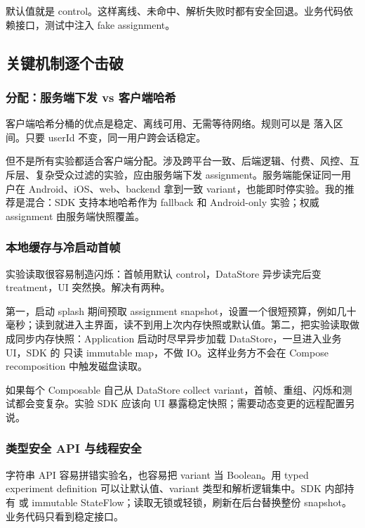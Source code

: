 默认值就是 control。这样离线、未命中、解析失败时都有安全回退。业务代码依赖接口，测试中注入 fake assignment。

\subsection{关键机制逐个击破}

\subsubsection{分配：服务端下发 vs 客户端哈希}

客户端哈希分桶的优点是稳定、离线可用、无需等待网络。规则可以是  落入区间。只要 userId 不变，同一用户跨会话稳定。

但不是所有实验都适合客户端分配。涉及跨平台一致、后端逻辑、付费、风控、互斥层、复杂受众过滤的实验，应由服务端下发 assignment。服务端能保证同一用户在 Android、iOS、web、backend 拿到一致 variant，也能即时停实验。我的推荐是混合：SDK 支持本地哈希作为 fallback 和 Android-only 实验；权威 assignment 由服务端快照覆盖。

\subsubsection{本地缓存与冷启动首帧}

实验读取很容易制造闪烁：首帧用默认 control，DataStore 异步读完后变 treatment，UI 突然换。解决有两种。

第一，启动 splash 期间预取 assignment snapshot，设置一个很短预算，例如几十毫秒；读到就进入主界面，读不到用上次内存快照或默认值。第二，把实验读取做成同步内存快照：Application 启动时尽早异步加载 DataStore，一旦进入业务 UI，SDK 的  只读 immutable map，不做 IO。这样业务方不会在 Compose recomposition 中触发磁盘读取。

\begin{pitfall}
如果每个 Composable 自己从 DataStore collect variant，首帧、重组、闪烁和测试都会变复杂。实验 SDK 应该向 UI 暴露稳定快照；需要动态变更的远程配置另说。
\end{pitfall}

\subsubsection{类型安全 API 与线程安全}

字符串 API 容易拼错实验名，也容易把 variant 当 Boolean。用 typed experiment definition 可以让默认值、variant 类型和解析逻辑集中。SDK 内部持有  或 immutable StateFlow；读取无锁或轻锁，刷新在后台替换整份 snapshot。业务代码只看到稳定接口。

